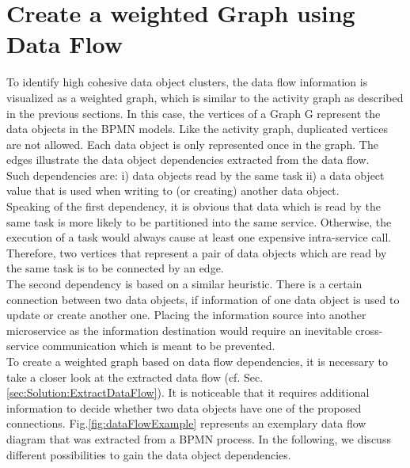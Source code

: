 \section{Create a weighted Graph using Data Flow}
\label{sec:Solution:CreateGraphData}
To identify high cohesive data object clusters, the data flow information is visualized as a weighted graph, which is similar to the activity graph as described in the previous sections. In this case, the vertices of a Graph G represent the data objects in the BPMN models. Like the activity graph, duplicated vertices are not allowed. Each data object is only represented once in the graph. The edges illustrate the data object dependencies extracted from the data flow. \\
Such dependencies are: i) data objects read by the same task ii) a data object value that is used when writing to (or creating) another data object. \\
Speaking of the first dependency, it is obvious that data which is read by the same task is more likely to be partitioned into the same service. Otherwise, the execution of a task would always cause at least one expensive intra-service call.
Therefore, two vertices that represent a pair of data objects which are read by the same task is to be connected by an edge. \\
The second dependency is based on a similar heuristic. There is a certain connection between two data objects, if information of one data object is used to update or create another one. Placing the information source into another microservice as the information destination would require an inevitable cross-service communication which is meant to be prevented. \\
To create a weighted graph based on data flow dependencies, it is necessary to take a closer look at the extracted data flow (cf. Sec.\ref{sec:Solution:ExtractDataFlow}). It is noticeable that it requires additional information to decide whether two data objects have one of the proposed connections. Fig.\ref{fig:dataFlowExample} represents an exemplary data flow diagram that was extracted from a BPMN process. In the following, we discuss different possibilities to gain the data object dependencies.


